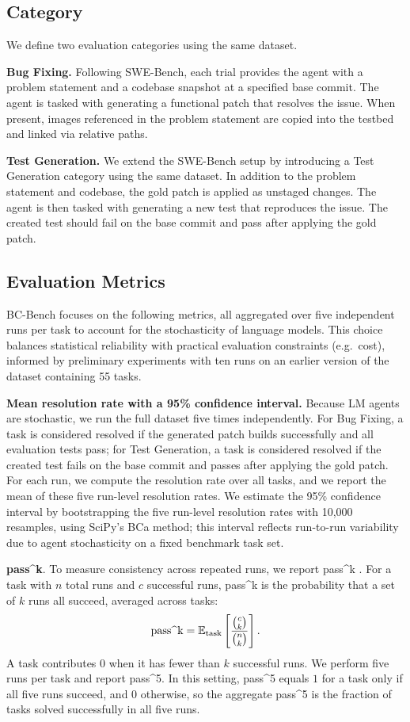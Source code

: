 \documentclass{article}
\newcommand{\passk}[1]{pass\textasciicircum #1}
\begin{document}
\subsection{Category}

We define two evaluation categories using the same dataset.

\textbf{Bug Fixing.} Following SWE-Bench, each trial provides the agent with a problem statement and a codebase snapshot at a specified base commit. The agent is tasked with generating a functional patch that resolves the issue. When present, images referenced in the problem statement are copied into the testbed and linked via relative paths.

\textbf{Test Generation.} We extend the SWE-Bench setup by introducing a Test Generation category using the same dataset. In addition to the problem statement and codebase, the gold patch is applied as unstaged changes. The agent is then tasked with generating a new test that reproduces the issue. The created test should fail on the base commit and pass after applying the gold patch.

\subsection{Evaluation Metrics}

BC-Bench focuses on the following metrics, all aggregated over five independent runs per task to account for the stochasticity of language models. This choice balances statistical reliability with practical evaluation constraints (e.g.\ cost), informed by preliminary experiments with ten runs on an earlier version of the dataset containing 55 tasks.

\textbf{Mean resolution rate with a 95\% confidence interval.} Because LM agents are stochastic, we run the full dataset five times independently. For Bug Fixing, a task is considered resolved if the generated patch builds successfully and all evaluation tests pass; for Test Generation, a task is considered resolved if the created test fails on the base commit and passes after applying the gold patch. For each run, we compute the resolution rate over all tasks, and we report the mean of these five run-level resolution rates. We estimate the 95\% confidence interval by bootstrapping the five run-level resolution rates with 10,000 resamples, using SciPy's BCa method; this interval reflects run-to-run variability due to agent stochasticity on a fixed benchmark task set.


\textbf{\passk{k}}. To measure consistency across repeated runs, we report \passk{k} \cite{yao_tau-bench_2024}. For a task with $n$ total runs and $c$ successful runs, \passk{k} is the probability that a set of $k$ runs all succeed, averaged across tasks:
\[
\text{pass\string^k}
=
\mathbb{E}_{\mathrm{task}}
\left[
\frac{\binom{c}{k}}{\binom{n}{k}}
\right].
\]
A task contributes $0$ when it has fewer than $k$ successful runs. We perform five runs per task and report \passk{5}. In this setting, \passk{5} equals $1$ for a task only if all five runs succeed, and $0$ otherwise, so the aggregate \passk{5} is the fraction of tasks solved successfully in all five runs.
\end{document}
